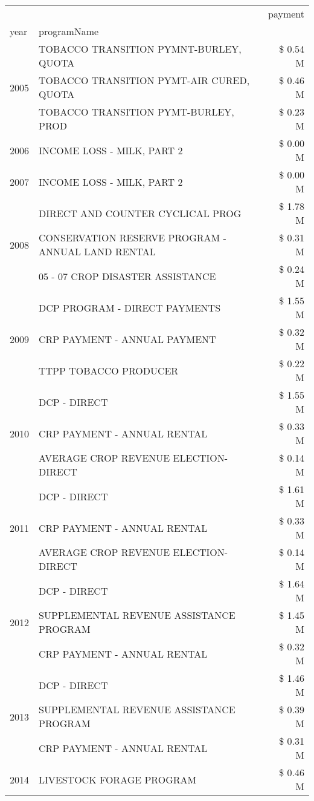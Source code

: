 \begin{tabular}{llr}
\toprule
 &  & payment \\
year & programName &  \\
\midrule
\multirow[t]{3}{*}{2005} & TOBACCO TRANSITION PYMNT-BURLEY, QUOTA & \$ 0.54 M \\
 & TOBACCO TRANSITION PYMT-AIR CURED, QUOTA & \$ 0.46 M \\
 & TOBACCO TRANSITION PYMT-BURLEY, PROD & \$ 0.23 M \\
\cline{1-3}
2006 & INCOME LOSS - MILK, PART 2 & \$ 0.00 M \\
\cline{1-3}
2007 & INCOME LOSS - MILK, PART 2 & \$ 0.00 M \\
\cline{1-3}
\multirow[t]{3}{*}{2008} & DIRECT AND COUNTER CYCLICAL PROG & \$ 1.78 M \\
 & CONSERVATION RESERVE PROGRAM - ANNUAL LAND RENTAL & \$ 0.31 M \\
 & 05 - 07 CROP DISASTER ASSISTANCE & \$ 0.24 M \\
\cline{1-3}
\multirow[t]{3}{*}{2009} & DCP PROGRAM - DIRECT PAYMENTS & \$ 1.55 M \\
 & CRP PAYMENT - ANNUAL PAYMENT & \$ 0.32 M \\
 & TTPP TOBACCO PRODUCER & \$ 0.22 M \\
\cline{1-3}
\multirow[t]{3}{*}{2010} & DCP - DIRECT & \$ 1.55 M \\
 & CRP PAYMENT - ANNUAL RENTAL & \$ 0.33 M \\
 & AVERAGE CROP REVENUE ELECTION-DIRECT & \$ 0.14 M \\
\cline{1-3}
\multirow[t]{3}{*}{2011} & DCP - DIRECT & \$ 1.61 M \\
 & CRP PAYMENT - ANNUAL RENTAL & \$ 0.33 M \\
 & AVERAGE CROP REVENUE ELECTION-DIRECT & \$ 0.14 M \\
\cline{1-3}
\multirow[t]{3}{*}{2012} & DCP - DIRECT & \$ 1.64 M \\
 & SUPPLEMENTAL REVENUE ASSISTANCE PROGRAM & \$ 1.45 M \\
 & CRP PAYMENT - ANNUAL RENTAL & \$ 0.32 M \\
\cline{1-3}
\multirow[t]{3}{*}{2013} & DCP - DIRECT & \$ 1.46 M \\
 & SUPPLEMENTAL REVENUE ASSISTANCE PROGRAM & \$ 0.39 M \\
 & CRP PAYMENT - ANNUAL RENTAL & \$ 0.31 M \\
\cline{1-3}
\multirow[t]{3}{*}{2014} & LIVESTOCK FORAGE PROGRAM & \$ 0.46 M \\

\end{tabular}
